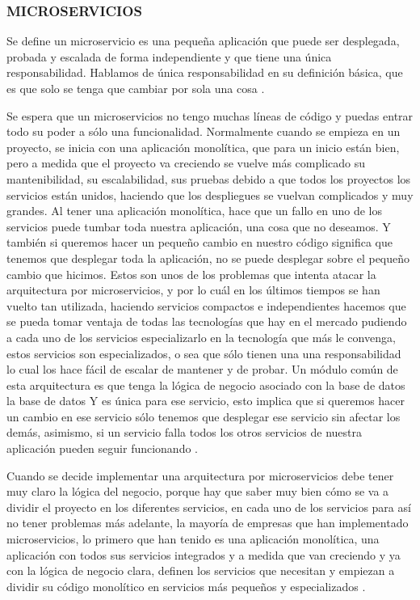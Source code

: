 \subsubsection{\textbf{MICROSERVICIOS}}
Se define un microservicio es una pequeña aplicación que puede ser desplegada, probada y escalada de forma independiente y que tiene una única responsabilidad\cite{7030212}. Hablamos de única responsabilidad en su definición básica, que es que solo se tenga que cambiar por sola una cosa \cite{Martin:2008:CCH:1388398}.


Se espera que un microservicios no tengo muchas líneas de código y puedas entrar todo su poder a sólo una funcionalidad. Normalmente cuando se empieza en un proyecto, se inicia con una aplicación monolítica, que para un inicio están bien, pero a medida que el proyecto va creciendo se vuelve más complicado su mantenibilidad, su escalabilidad, sus pruebas debido a que todos los proyectos los servicios están unidos, haciendo que los despliegues se vuelvan complicados y muy grandes. Al tener una aplicación monolítica, hace que un fallo en uno de los servicios puede tumbar toda nuestra aplicación, una cosa que no deseamos. Y también si queremos hacer un pequeño cambio en nuestro código significa que tenemos que desplegar toda la aplicación, no se puede desplegar sobre el pequeño cambio que hicimos. Estos son unos de los problemas que intenta atacar la arquitectura por microservicios, y por lo cuál en los últimos tiempos se han vuelto tan utilizada, haciendo servicios compactos e independientes hacemos que se pueda tomar ventaja de todas las tecnologías que hay en el mercado pudiendo a cada uno de los servicios especializarlo en la tecnología que más le convenga, estos servicios son especializados, o sea que sólo tienen una una responsabilidad lo cual los hace fácil de escalar de mantener y de probar. Un módulo común de esta arquitectura es que tenga la lógica de negocio asociado con la base de datos la base de datos Y es única para ese servicio, esto implica que si queremos hacer un cambio en ese servicio sólo tenemos que desplegar ese servicio sin afectar los demás, asimismo, si un servicio falla todos los otros servicios de nuestra aplicación pueden seguir funcionando .


Cuando se decide implementar una arquitectura por microservicios debe tener muy claro la lógica del negocio, porque hay que saber muy bien cómo se va a dividir el proyecto en los diferentes servicios, en cada uno de los servicios para así no tener problemas más adelante, la mayoría de empresas que han implementado microservicios, lo primero que han tenido es una aplicación monolítica, una aplicación con todos sus servicios integrados y a medida que van creciendo y ya con la lógica de negocio clara, definen los servicios que necesitan y empiezan a dividir su código monolítico en servicios más pequeños y especializados \cite{Dragoni2017}. 

